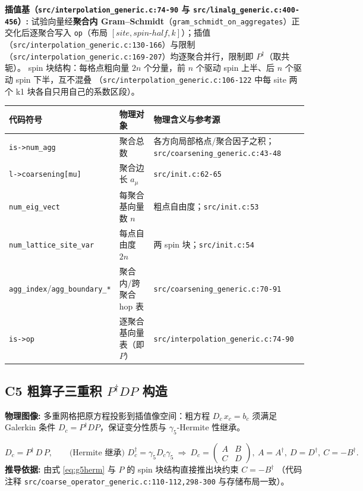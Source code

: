 \documentclass[UTF8]{ctexart}
\begin{document}
\textbf{插值基（\texttt{\nolinkurl{src/interpolation_generic.c:74-90}} 与 \texttt{\nolinkurl{src/linalg_generic.c:400-456}}）:}
试验向量经\textbf{聚合内 Gram--Schmidt}（\texttt{gram\_schmidt\_on\_aggregates}）正交化后逐聚合写入
\texttt{op}（布局 $[site, spin\text{-}half, k]$）；插值
（\texttt{\nolinkurl{src/interpolation_generic.c:130-166}}）与限制
（\texttt{\nolinkurl{src/interpolation_generic.c:169-207}}）均逐聚合并行，限制即 $P^\dagger$（取共轭）。
spin 块结构：每格点粗向量 $2n$ 个分量，前 $n$ 个驱动 spin 上半、后 $n$ 个驱动 spin 下半，互不混叠
（\texttt{\nolinkurl{src/interpolation_generic.c:106-122}} 中每 site 两个 k1 块各自只用自己的系数区段）。

\begin{xltabular}{\textwidth}{llX}
\toprule
\textcolor{map}{代码符号} & 物理对象 & 物理含义与参考源 \\
\midrule
\endhead
\texttt{is->num\_agg} & 聚合总数 & 各方向局部格点/聚合因子之积；\texttt{\nolinkurl{src/coarsening_generic.c:43-48}} \\
\texttt{l->coarsening[mu]} & 聚合边长 $a_\mu$ & \texttt{\nolinkurl{src/init.c:62-65}} \\
\texttt{num\_eig\_vect} & 每聚合基向量数 $n$ & 粗点自由度；\texttt{\nolinkurl{src/init.c:53}} \\
\texttt{num\_lattice\_site\_var} & 每点自由度 $2n$ & 两 spin 块；\texttt{\nolinkurl{src/init.c:54}} \\
\texttt{agg\_index}/\texttt{agg\_boundary\_*} & 聚合内/跨聚合 hop 表 & \texttt{\nolinkurl{src/coarsening_generic.c:70-91}} \\
\texttt{is->op} & 逐聚合基向量表（即 $P$） & \texttt{\nolinkurl{src/interpolation_generic.c:74-90}} \\
\bottomrule
\end{xltabular}

\subsection{C5 粗算子三重积 $P^\dagger D P$ 构造}
\begin{physbox}
\textbf{物理图像:} 多重网格把原方程投影到插值像空间：粗方程 $D_c\,x_c = b_c$ 须满足
Galerkin 条件 $D_c = P^\dagger D P$，保证变分性质与 $\gamma_5$-Hermite 性继承。
\end{physbox}

\begin{equation}\label{eq:galerkin}
D_c = P^\dagger\, D\, P ,\qquad
\text{(Hermite 继承) } D_c^\dagger = \gamma_5 D_c \gamma_5 \ \Rightarrow\
D_c = \begin{pmatrix} A & B\\ C & D \end{pmatrix},\ A=A^\dagger,\ D=D^\dagger,\ C=-B^\dagger .
\end{equation}
\textbf{推导依据:} 由式 \eqref{eq:g5herm} 与 $P$ 的 spin 块结构直接推出块约束 $C=-B^\dagger$
（代码注释 \texttt{\nolinkurl{src/coarse_operator_generic.c:110-112,298-300}} 与存储布局一致）。
\end{document}
